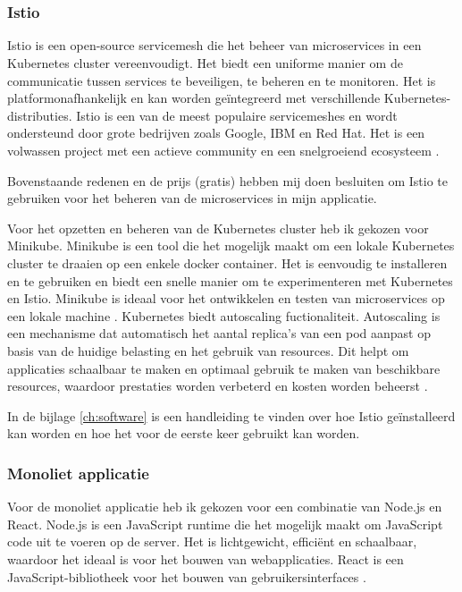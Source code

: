 \chapter*{}%
\label{ch:keuze-software}

\subsection*{Istio}
Istio is een open-source servicemesh die het beheer van microservices in een Kubernetes cluster vereenvoudigt. Het biedt een uniforme manier om de communicatie tussen services te beveiligen, te beheren en te monitoren. Het is platformonafhankelijk en kan worden geïntegreerd met verschillende Kubernetes-distributies. Istio is een van de meest populaire servicemeshes en wordt ondersteund door grote bedrijven zoals Google, IBM en Red Hat. Het is een volwassen project met een actieve community en een snelgroeiend ecosysteem \autocite{Istio}. 

Bovenstaande redenen en de prijs (gratis) hebben mij doen besluiten om Istio te gebruiken voor het beheren van de microservices in mijn applicatie. 

Voor het opzetten en beheren van de Kubernetes cluster heb ik gekozen voor Minikube. Minikube is een tool die het mogelijk maakt om een lokale Kubernetes cluster te draaien op een enkele docker container. Het is eenvoudig te installeren en te gebruiken en biedt een snelle manier om te experimenteren met Kubernetes en Istio. Minikube is ideaal voor het ontwikkelen en testen van microservices op een lokale machine \autocite{Minikube}. Kubernetes biedt autoscaling fuctionaliteit. Autoscaling is een mechanisme dat automatisch het aantal replica’s van een pod aanpast op basis van de huidige belasting en het gebruik van resources. Dit helpt om applicaties schaalbaar te maken en optimaal gebruik te maken van beschikbare resources, waardoor prestaties worden verbeterd en kosten worden beheerst \autocite{Kubernetes}.


In de bijlage \ref{ch:software} is een handleiding te vinden over hoe Istio geïnstalleerd kan worden en hoe het voor de eerste keer gebruikt kan worden.

\subsection*{Monoliet applicatie}
Voor de monoliet applicatie heb ik gekozen voor een combinatie van Node.js en React. Node.js is een JavaScript runtime die het mogelijk maakt om JavaScript code uit te voeren op de server. Het is lichtgewicht, efficiënt en schaalbaar, waardoor het ideaal is voor het bouwen van webapplicaties. React is een JavaScript-bibliotheek voor het bouwen van gebruikersinterfaces \autocite{Nodejs} \autocite{React}.

